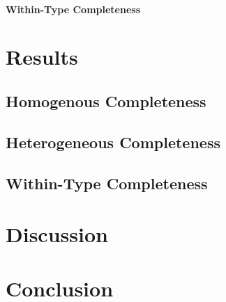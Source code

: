 \documentclass[letterpaper,11pt,leqno]{article}
\begin{document}
\paragraph{Within-Type Completeness}

\section{Results}

\subsection{Homogenous Completeness}

\subsection{Heterogeneous Completeness}

\subsection{Within-Type Completeness}

\section{Discussion}

\section{Conclusion}




\end{document}
